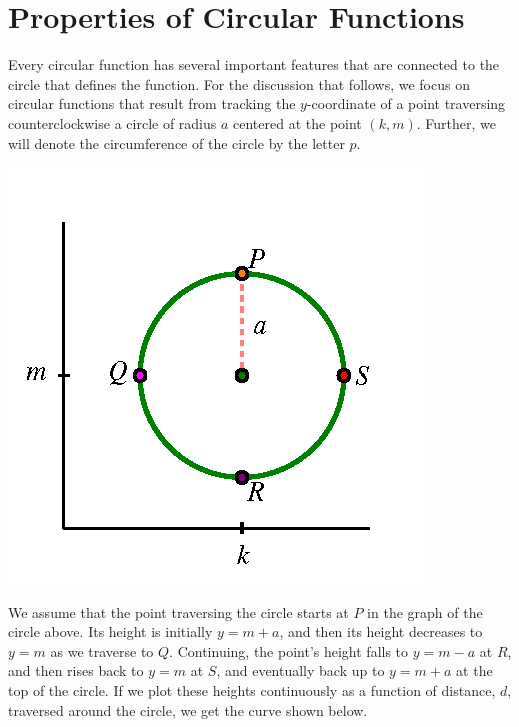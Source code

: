 \documentclass[nooutcomes, noauthor]{ximera}
\begin{document}


\section{Properties of Circular Functions}

Every circular function has several important features that are connected to the circle that defines the function.  For the discussion that follows, we focus on circular functions that result from tracking the \(y\)-coordinate of a point traversing counterclockwise a circle of radius \(a\) centered at the point \((k,m)\).  Further, we will denote the circumference of the circle by the letter \(p\).%

\begin{image}
\includegraphics{traversing-circular-properties-circle.png}
\end{image}

We assume that the point traversing the circle starts at \(P\) in the graph of the circle above.  Its height is initially \(y = m + a\), and then its height decreases to \(y = m\) as we traverse to \(Q\).  Continuing, the point's height falls to \(y = m - a\) at \(R\), and then rises back to \(y = m\) at \(S\), and eventually back up to \(y = m+a\) at the top of the circle.  If we plot these heights continuously as a function of distance, \(d\), traversed around the circle, we get the curve shown below. 
\end{document}
